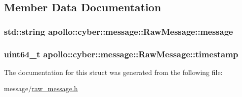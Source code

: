 \subsection{Member Data Documentation}
\hypertarget{structapollo_1_1cyber_1_1message_1_1RawMessage_a35cbf9f8f1e2e2560e5a461695afecb0}{
\subsubsection[{message}]{\setlength{\rightskip}{0pt plus 5cm}std\-::string apollo\-::cyber\-::message\-::\-Raw\-Message\-::message}}\label{structapollo_1_1cyber_1_1message_1_1RawMessage_a35cbf9f8f1e2e2560e5a461695afecb0}
\hypertarget{structapollo_1_1cyber_1_1message_1_1RawMessage_af22d0984f33c49d17710308d7cb1d271}{
\subsubsection[{timestamp}]{\setlength{\rightskip}{0pt plus 5cm}uint64\-\_\-t apollo\-::cyber\-::message\-::\-Raw\-Message\-::timestamp}}\label{structapollo_1_1cyber_1_1message_1_1RawMessage_af22d0984f33c49d17710308d7cb1d271}


The documentation for this struct was generated from the following file\-:\begin{DoxyCompactItemize}
\item 
message/\hyperlink{raw__message_8h}{raw\-\_\-message.\-h}\end{DoxyCompactItemize}
